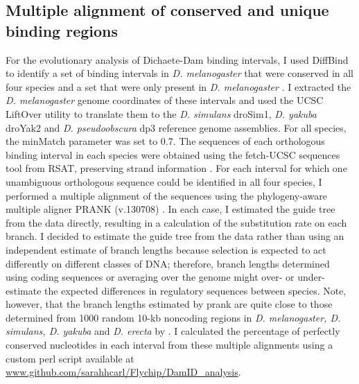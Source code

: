 \subsection{Multiple alignment of conserved and unique binding regions}
For the evolutionary analysis of Dichaete-Dam binding intervals, I used DiffBind to identify a set of binding intervals in \emph{D. melanogaster} that were conserved in all four species and a set that were only present in \emph{D. melanogaster} \citep{ross-innes_differential_2012}. I extracted the \emph{D. melanogaster} genome coordinates of these intervals and used the UCSC LiftOver utility to translate them to the \emph{D. simulans} droSim1, \emph{D. yakuba} droYak2 and \emph{D. pseudoobscura} dp3 reference genome assemblies. For all species, the minMatch parameter was set to 0.7. The sequences of each orthologous binding interval in each species were obtained using the fetch-UCSC sequences tool from RSAT, preserving strand information \citep{thomas-chollier_rsat_2011}. For each interval for which one unambiguous orthologous sequence could be identified in all four species, I performed a multiple alignment of the sequences using the phylogeny-aware multiple aligner PRANK (v.130708) \citep{loytynoja_algorithm_2005,loytynoja_phylogeny-aware_2008}. In each case, I estimated the guide tree from the data directly, resulting in a calculation of the substitution rate on each branch. I decided to estimate the guide tree from the data rather than using an independent estimate of branch lengths because selection is expected to act differently on different classes of DNA; therefore, branch lengths determined using coding sequences or averaging over the genome might over- or under-estimate the expected differences in regulatory sequences between species. Note, however, that the branch lengths estimated by prank are quite close to those determined from 1000 random 10-kb noncoding regions in \emph{D. melanogaster, D. simulans, D. yakuba} and \emph{D. erecta} by \citet{moses_large-scale_2006}. I calculated the percentage of perfectly conserved nucleotides in each interval from these multiple alignments using a custom perl script available at \url{www.github.com/sarahhcarl/Flychip/DamID_analysis}.

